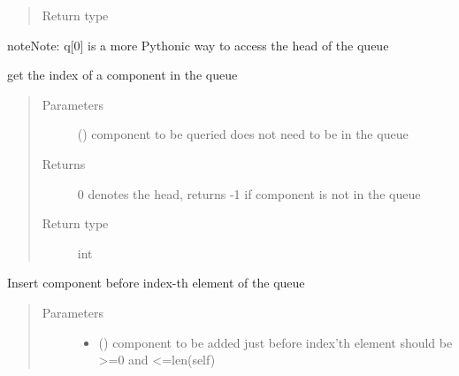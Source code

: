 \documentclass[letterpaper,10pt,english]{sphinxmanual}
\begin{document}
\begin{fulllineitems}
\begin{fulllineitems}
\begin{quote}
\begin{description}
\item[{Return type}] \leavevmode
{\hyperref[\detokenize{Reference:salabim.Component}]{}}

\end{description}\end{quote}

\begin{sphinxadmonition}{note}{Note:}
q{[}0{]} is a more Pythonic way to access the head of the queue
\end{sphinxadmonition}

\end{fulllineitems}


\begin{fulllineitems}
\label{\detokenize{Reference:salabim.Queue.index}}
get the index of a component in the queue
\begin{quote}\begin{description}
\item[{Parameters}] \leavevmode
{} ({\hyperref[\detokenize{Reference:salabim.Component}]{}}) \textendash{} component to be queried 
does not need to be in the queue

\item[{Returns}] \leavevmode
{} \textendash{} 0 denotes the head, 
returns -1 if component is not in the queue

\item[{Return type}] \leavevmode
int

\end{description}\end{quote}

\end{fulllineitems}


\begin{fulllineitems}
\label{\detokenize{Reference:salabim.Queue.insert}}
Insert component before index-th element of the queue
\begin{quote}\begin{description}
\item[{Parameters}] \leavevmode\begin{itemize}
\item {} 
 () \textendash{} component to be added just before index’th element 
should be \textgreater{}=0 and \textless{}=len(self)


\end{itemize}
\end{description}
\end{quote}
\end{fulllineitems}
\end{fulllineitems}
\end{document}
